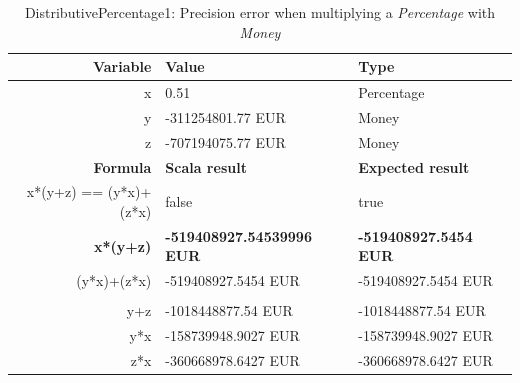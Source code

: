 \begin{table}[!ht]
\centering
\begin{tabular}{rll}
\hline
\textbf{Variable}      & \textbf{Value}                   & \textbf{Type}                \\ \hline
x                      & 0.51                             & Percentage                   \\
y                      & -311254801.77 EUR                & Money                        \\
z                      & -707194075.77 EUR                & Money                        \\ \hline
\textbf{Formula}       & \textbf{Scala result}            & \textbf{Expected result}     \\ \hline
x*(y+z) == (y*x)+(z*x) & false                            & true                         \\
\textbf{x*(y+z)}       & \textbf{-519408927.54539996 EUR} & \textbf{-519408927.5454 EUR} \\
(y*x)+(z*x)            & -519408927.5454 EUR              & -519408927.5454 EUR          \\
                       &                                  &                              \\
y+z                    & -1018448877.54 EUR               & -1018448877.54 EUR           \\
y*x                    & -158739948.9027 EUR              & -158739948.9027 EUR          \\
z*x                    & -360668978.6427 EUR              & -360668978.6427 EUR          \\ \hline
\end{tabular}
\caption{DistributivePercentage1: Precision error when multiplying a \textit{Percentage} with \textit{Money}}
\label{ch4_init_check_DistributivePercentage1}
\end{table}
\FloatBarrier\noindent

